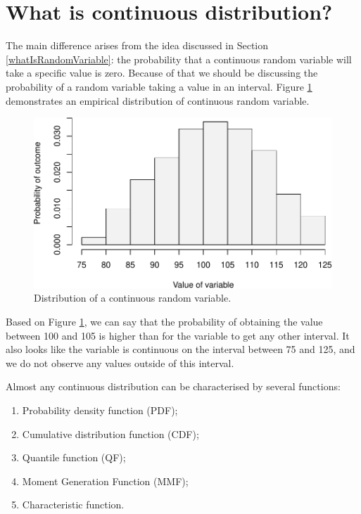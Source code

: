 \documentclass[
]{book}
\providecommand{\tightlist}{%
  \setlength{\itemsep}{0pt}\setlength{\parskip}{0pt}}
\theoremstyle{definition}
\theoremstyle{definition}
\theoremstyle{definition}
\theoremstyle{definition}
\theoremstyle{remark}
\begin{document}
\hypertarget{distributionsContinuousWhat}{%
\section{What is continuous distribution?}\label{distributionsContinuousWhat}}

The main difference arises from the idea discussed in Section \ref{whatIsRandomVariable}: the probability that a continuous random variable will take a specific value is zero. Because of that we should be discussing the probability of a random variable taking a value in an interval. Figure \ref{fig:distributionContinuousExample} demonstrates an empirical distribution of continuous random variable.

\begin{figure}
\centering
\includegraphics{Svetunkov---Statistics-for-Business-Analytics_files/figure-latex/distributionContinuousExample-1.pdf}
\caption{\label{fig:distributionContinuousExample}Distribution of a continuous random variable.}
\end{figure}

Based on Figure \ref{fig:distributionContinuousExample}, we can say that the probability of obtaining the value between 100 and 105 is higher than for the variable to get any other interval. It also looks like the variable is continuous on the interval between 75 and 125, and we do not observe any values outside of this interval.

Almost any continuous distribution can be characterised by several functions:

\begin{enumerate}
\def\labelenumi{\arabic{enumi}.}
\tightlist
\item
  Probability density function (PDF);
\item
  Cumulative distribution function (CDF);
\item
  Quantile function (QF);
\item
  Moment Generation Function (MMF);
\item
  Characteristic function.
\end{enumerate}
\end{document}
